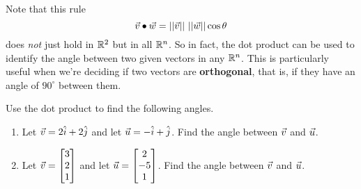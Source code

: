 Note that this rule $$\vcv\bullet\vcw=||\vcv|| \ ||\vcw||\cos\theta$$ does \textit{not} just hold in $\mathbb{R}^2$ but in all $\mathbb{R}^n$. So in fact, the dot product can be used to identify the angle between two given vectors in any $\mathbb{R}^n$. This is particularly useful when we're deciding if two vectors are \textbf{orthogonal}, that is, if they have an angle of $90^\circ$ between them.

\begin{exercise}{}
Use the dot product to find the following angles.
\begin{enumerate}
\item Let $\vec{v}=2\hat{i}+2\hat{j}$ and let $\vec{u}=-\hat{i}+\hat{j}$. Find the angle between $\vec{v}$ and $\vec{u}$.
\vspace{1em}
\item Let $\vec{v}=\begin{bmatrix}3\\2\\1\end{bmatrix}$ and let $\vec{u}=\begin{bmatrix}2\\-5\\1\end{bmatrix}$. Find the angle between $\vec{v}$ and $\vec{u}$.
\vspace{1em}
\end{enumerate}
\end{exercise}
